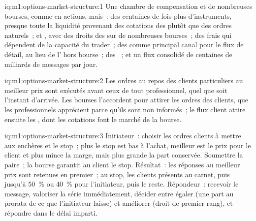 \begin{solution}{iq:m1:options-market-structure:1}
Une chambre de compensation et de nombreuses bourses, comme en actions, mais~: des centaines de
fois plus d'instruments, presque toute la liquidité provenant des cotations des 
plutôt que des ordres naturels~;  et , avec des droits des
 sur de nombreuses bourses~; des frais qui dépendent de la capacité du
trader~; des  comme principal canal pour le flux de détail, au lieu de
l' hors bourse~; des ~; et un flux consolidé de
centaines de milliards de messages par jour.
\end{solution}

\begin{solution}{iq:m1:options-market-structure:2}
Les ordres au repos des clients particuliers au meilleur prix sont exécutés avant ceux de tout
professionnel, quel que soit l'instant d'arrivée. Les bourses l'accordent pour attirer les ordres
des clients, que les professionnels apprécient parce qu'ils sont non informés~; le flux
client attire ensuite les , dont les cotations font le
marché de la bourse.
\end{solution}

\begin{solution}{iq:m1:options-market-structure:3}
Initiateur~: choisir les ordres clients à mettre aux enchères et le stop~; plus le stop est bas
à l'achat, meilleur est le prix pour le client et plus mince la marge,
mais plus grande la part conservée. Soumettre la paire~; la bourse garantit au client le stop. Résultat~:
les réponses au meilleur prix sont retenues en premier~; au stop, les clients présents au carnet,
puis jusqu'à 50~\% ou 40~\% pour l'initiateur, puis le reste. Répondeur~: recevoir le message,
valoriser la série immédiatement, décider entre égaler (une part au prorata de ce que
l'initiateur laisse) et améliorer (droit de premier rang), et répondre
dans le délai imparti.
\end{solution}


